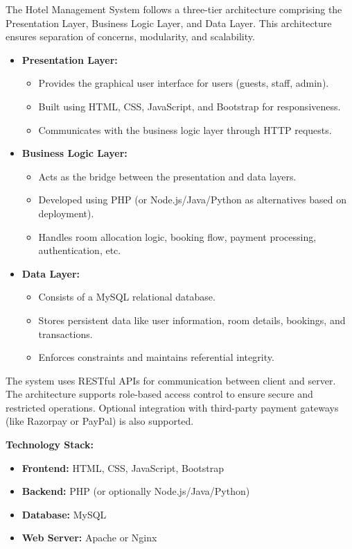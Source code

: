 \documentclass[a4paper,12pt]{article}
\begin{document}
The Hotel Management System follows a three-tier architecture comprising the Presentation Layer, Business Logic Layer, and Data Layer. This architecture ensures separation of concerns, modularity, and scalability.

\begin{itemize}
    \item \textbf{Presentation Layer:}
    \begin{itemize}
        \item Provides the graphical user interface for users (guests, staff, admin).
        \item Built using HTML, CSS, JavaScript, and Bootstrap for responsiveness.
        \item Communicates with the business logic layer through HTTP requests.
    \end{itemize}

    \item \textbf{Business Logic Layer:}
    \begin{itemize}
        \item Acts as the bridge between the presentation and data layers.
        \item Developed using PHP (or Node.js/Java/Python as alternatives based on deployment).
        \item Handles room allocation logic, booking flow, payment processing, authentication, etc.
    \end{itemize}

    \item \textbf{Data Layer:}
    \begin{itemize}
        \item Consists of a MySQL relational database.
        \item Stores persistent data like user information, room details, bookings, and transactions.
        \item Enforces constraints and maintains referential integrity.
    \end{itemize}
\end{itemize}

The system uses RESTful APIs for communication between client and server. The architecture supports role-based access control to ensure secure and restricted operations. Optional integration with third-party payment gateways (like Razorpay or PayPal) is also supported.

\vspace{0.5cm}
\textbf{Technology Stack:}
\begin{itemize}
    \item \textbf{Frontend:} HTML, CSS, JavaScript, Bootstrap
    \item \textbf{Backend:} PHP (or optionally Node.js/Java/Python)
    \item \textbf{Database:} MySQL
    \item \textbf{Web Server:} Apache or Nginx
\end{itemize}
\end{document}
